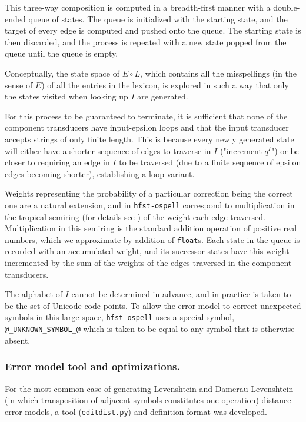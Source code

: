 \documentclass{llncs}
\begin{document}
This three-way composition is computed in a breadth-first manner with a
double-ended queue of states. The queue is initialized with the starting state,
and the target of every edge is computed and pushed onto the
queue. The starting state is then discarded, and the process is repeated
with a new state popped from the queue until the queue is empty.

Conceptually, the state space of $E \circ L$, which contains all the
misspellings (in the sense of $E$) of all the entries in the lexicon, is
explored in such a way that only the states visited when looking up $I$ are
generated.

For this process to be guaranteed to terminate, it is sufficient that none of
the component transducers have input-epsilon loops and that the input
transducer accepts strings of only finite length. This is because every newly
generated state will either have a shorter sequence of edges to traverse in
$I$ ("increment $q^I$") or be closer to requiring an edge in $I$ to be traversed
(due to a finite sequence of epsilon edges becoming shorter), establishing a
loop variant.

Weights representing the probability of a particular correction being the
correct one are a natural extension, and in \verb!hfst-ospell! correspond to
multiplication in the tropical semiring (for details see \cite{openfst/2007})
of the weight each edge
traversed. Multiplication in this semiring is the standard addition operation
of positive real numbers, which we approximate by addition of \verb!float!s.
Each state in the queue is recorded with an accumulated weight, and its
successor states have this weight incremented by the sum of the weights of
the edges traversed in the component transducers.

The alphabet of $I$ cannot be determined in advance, and in practice is taken
to be the set of Unicode code points. To allow the error model to correct
unexpected symbols in this large space, \verb!hfst-ospell! uses a special
symbol, \verb!@_UNKNOWN_SYMBOL_@! which is taken to be equal to any symbol
that is otherwise absent.

\subsubsection{Error model tool and optimizations.}
For the most common case of generating Levenshtein and
Damerau-Levenshtein (in which transposition of adjacent symbols constitutes
one operation) distance error models, a tool (\verb!editdist.py!) and
definition format was developed.
\end{document}
